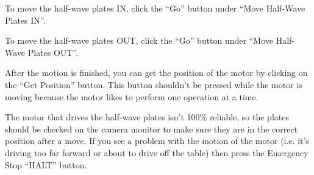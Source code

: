 {To move the half-wave plates IN, click the ``Go'' button under
``Move Half-Wave Plates IN''.  

To move the half-wave plates OUT, click the ``Go'' button under
``Move Half-Wave Plates OUT''.

After the motion is finished, you can get the position of the 
motor by clicking on the ``Get Position'' button.  This button
shouldn't be pressed while the motor is moving because the motor
likes to perform one operation at a time.

The motor that drives the half-wave plates isn't 100\% reliable,
so the plates should be checked on the camera monitor to make 
sure they are in the correct position after a move.  If
you see a problem with the motion of the motor (i.e. it's driving too
far forward or about to drive off the table) then press the
Emergency Stop ``HALT'' button.

} %
